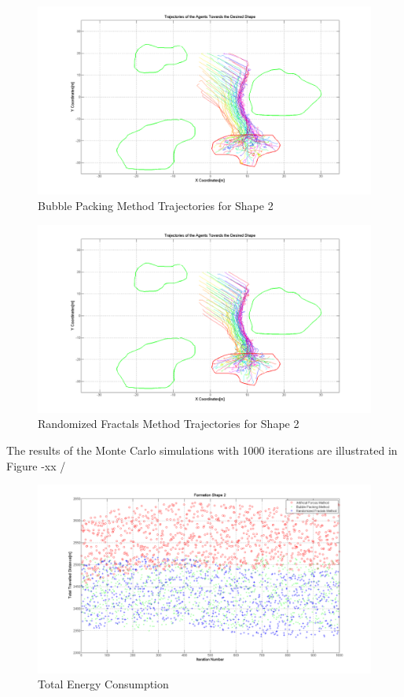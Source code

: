 		   \begin{figure}[H]
		   	\caption{Bubble Packing Method Trajectories for Shape 2}
		   	\centerline{\includegraphics[scale = 0.35]{Bubble_Trajectories_2}}
		   \end{figure} 	
		   
		   \begin{figure}[H]
		   	\caption{Randomized Fractals Method Trajectories for Shape 2}
		   	\centerline{\includegraphics[scale = 0.35]{Randomized_Trajectories_2}}
		   \end{figure} 	
		   
        The results of the Monte Carlo simulations with 1000 iterations are illustrated in Figure -xx /
		   \begin{figure}[H]
		   	\caption{Total Energy Consumption}
		   	\centerline{\includegraphics[scale = 0.35]{Total_Energy_Shape_2}}
		   \end{figure} 	
		   
